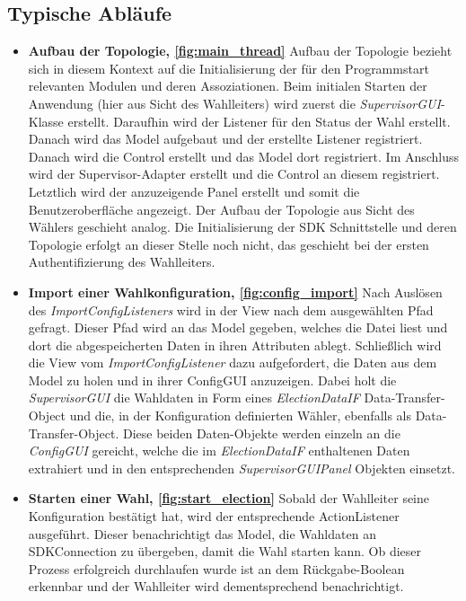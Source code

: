 \documentclass[parskip=full]{scrartcl}
\newcommand{\fakeparagraph}[1]{\textbf{#1}}
\begin{document}
\subsection{Typische Abläufe}
	\begin{itemize}
	\item\fakeparagraph{Aufbau der Topologie, \autoref{fig:main_thread}} Aufbau der Topologie bezieht sich in diesem Kontext auf die Initialisierung der für den Programmstart relevanten Modulen und deren Assoziationen. Beim initialen Starten der Anwendung (hier aus Sicht des Wahlleiters) wird zuerst die \textit{SupervisorGUI}-Klasse erstellt. Daraufhin wird der Listener für den Status der Wahl erstellt. Danach wird das Model aufgebaut und der erstellte Listener registriert. Danach wird die Control erstellt und das Model dort registriert. Im Anschluss wird der Supervisor-Adapter erstellt und die Control an diesem registriert. Letztlich wird der anzuzeigende Panel erstellt und somit die Benutzeroberfläche angezeigt.
	Der Aufbau der Topologie aus Sicht des Wählers geschieht analog.
	Die Initialisierung der SDK Schnittstelle und deren Topologie erfolgt an dieser Stelle noch nicht, das geschieht bei der ersten Authentifizierung des Wahlleiters.
	
	\item\fakeparagraph{Import einer Wahlkonfiguration, \autoref{fig:config_import}} Nach Auslösen des \textit{ImportConfigListeners} wird in der View nach dem ausgewählten Pfad gefragt. Dieser Pfad wird an das Model gegeben, welches die Datei liest und dort die abgespeicherten Daten in ihren Attributen ablegt.
	Schließlich wird die View vom \textit{ImportConfigListener} dazu aufgefordert, die Daten aus dem Model zu holen und in ihrer ConfigGUI anzuzeigen.
	Dabei holt die \textit{SupervisorGUI} die Wahldaten in Form eines \textit{ElectionDataIF} Data-Transfer-Object und die, in der Konfiguration definierten Wähler, ebenfalls als Data-Transfer-Object. Diese beiden Daten-Objekte werden einzeln an die \textit{ConfigGUI} gereicht, welche die im \textit{ElectionDataIF} enthaltenen Daten extrahiert und in den entsprechenden \textit{SupervisorGUIPanel} Objekten einsetzt.

	\item\fakeparagraph{Starten einer Wahl, \autoref{fig:start_election}} Sobald der Wahlleiter seine Konfiguration bestätigt hat, wird der entsprechende ActionListener ausgeführt. Dieser benachrichtigt das Model, die Wahldaten an SDKConnection zu übergeben, damit die Wahl starten kann. Ob dieser Prozess erfolgreich durchlaufen wurde ist an dem Rückgabe-Boolean erkennbar und der Wahlleiter wird dementsprechend benachrichtigt.
	

\end{itemize}
\end{document}
